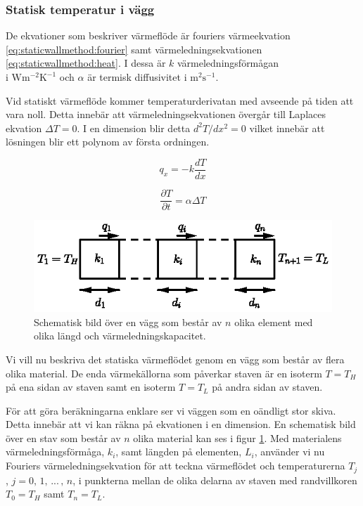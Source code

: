 \subsubsection{Statisk temperatur i vägg}


De ekvationer som beskriver värmeflöde är fouriers värmeekvation
\eqref{eq:staticwallmethod:fourier} samt värmeledningsekvationen
\eqref{eq:staticwallmethod:heat}. I dessa är
$k$ värmeledningsförmågan\\i $\mbox{W}\mbox{m}^{-2}\mbox{K}^{-1}$ och
$\alpha$ är termisk diffusivitet i $\mbox{m}^2\mbox{s}^{-1}$. \cite{physicshandbook}

Vid statiskt värmeflöde
kommer temperaturderivatan med avseende på tiden att vara noll.
Detta innebär att värmeledningsekvationen övergår till Laplaces ekvation
$\Delta{}T = 0$. I en dimension blir detta $d^2T/dx^2 = 0$ vilket innebär
att lösningen blir ett polynom av första ordningen.  

\begin{equation}
\label{eq:staticwallmethod:fourier}
q_x = -k\frac{dT}{dx}
\end{equation}

\begin{equation}
\label{eq:staticwallmethod:heat}
\frac{\partial{}T}{\partial{}t} = \alpha\Delta{}T
\end{equation}

\begin{figure}
\centering
\includegraphics{images/wall.eps}
\caption{Schematisk bild över en vägg som består av $n$ olika element med olika
längd och värmeledningskapacitet.}\label{fig:staticwallmethod:wall}
\end{figure}

\noindent
Vi vill nu beskriva det statiska värmeflödet genom en vägg som består
av flera olika material. De enda värmekällorna som påverkar staven
är en isoterm $T = T_H$ på ena sidan av staven
samt en isoterm $T = T_L$ på andra sidan av staven.

För att göra beräkningarna enklare
ser vi väggen som en oändligt stor skiva. Detta innebär att vi kan räkna
på ekvationen i en dimension. En schematisk bild över en stav som består av
$n$ olika material kan ses i figur \ref{fig:staticwallmethod:wall}.
Med materialens värmeledningsförmåga, $k_i$, samt längden
på elementen, $L_i$, använder vi nu Fouriers värmeledningsekvation för
att teckna värmeflödet och temperaturerna $T_j$,  $j=0,\,1,\,...\,,\,n$, i punkterna
mellan de olika delarna av staven med randvillkoren $T_0 = T_H$ samt
$T_n = T_L$.

